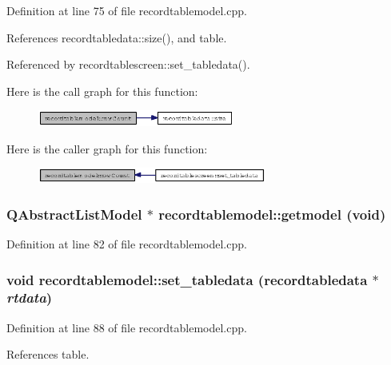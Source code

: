 Definition at line 75 of file recordtablemodel.cpp.

References recordtabledata::size(), and table.

Referenced by recordtablescreen::set\_\-tabledata().

Here is the call graph for this function:\begin{figure}[H]
\begin{center}
\leavevmode
\includegraphics[width=183pt]{classrecordtablemodel_d243937a7c319b06445655687347bfa0_cgraph}
\end{center}
\end{figure}


Here is the caller graph for this function:\begin{figure}[H]
\begin{center}
\leavevmode
\includegraphics[width=213pt]{classrecordtablemodel_d243937a7c319b06445655687347bfa0_icgraph}
\end{center}
\end{figure}
\subsubsection{\setlength{\rightskip}{0pt plus 5cm}QAbstract\-List\-Model $\ast$ recordtablemodel::getmodel (void)}\label{classrecordtablemodel_535d23269d91adde52e73d701f84c4d3}




Definition at line 82 of file recordtablemodel.cpp.
\subsubsection{\setlength{\rightskip}{0pt plus 5cm}void recordtablemodel::set\_\-tabledata ({\bf recordtabledata} $\ast$ {\em rtdata})}\label{classrecordtablemodel_c7525d3fce71b4ad225169190141088f}




Definition at line 88 of file recordtablemodel.cpp.

References table.

